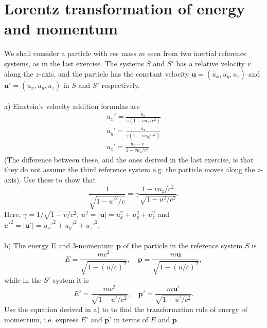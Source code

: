 \documentclass{article}
\begin{document}
    \section{Lorentz transformation of energy and momentum}
    We shall consider a particle with res mass $m$ seen from two inertial reference systems, as in the last exercise. The systems $S$ and $S'$ has a relative velocity $v$ along the $z$-axis, and the particle has the constant velocity $\mathbf{u} = (u_x, u_y, u_z)$ and $\mathbf{u'} = (u_x, u_y, u_z)$ in $S$ and $S'$ respectively. \\ \\
    a) Einstein's velocity addition formulas are
    \begin{align*}
        u_x' = \frac{u_x}{\gamma(1 - v u_z/c^2)} \\
        u_y' = \frac{u_x}{\gamma(1 - v u_y/c^2)} \\
        u_z' = \frac{u_z - v}{1 - v u_z/c^2}
    \end{align*}
    (The difference between these, and the ones derived in the last exercise, is that they do not assume the third reference system e.g. the particle moves along the $z$-axis). Use these to show that
    \begin{equation*}
        \frac{1}{\sqrt{1 - u'^2/c}} = \gamma \frac{1 - v u_z / c^2}{\sqrt{1 - u^2/c^2}}.
    \end{equation*}
    Here, $\gamma = 1 / \sqrt{1 - v/c^2}$, $u^2= |\mathbf{u}| = u_x^2 + u_y^2 + u_z^2$ and $u'^2= |\mathbf{u}'|= u_x'^2 + u_y'^2 + u_z'^2$. \\ \\
    b) The energy E and 3-momentum $\mathbf{p}$ of the particle in the reference system $S$ is
    \begin{equation*}
        E = \frac{mc^2}{\sqrt{1 - (u/c)^2}}, \quad \mathbf{p} =\frac{m\mathbf{u}}{\sqrt{1 - (u/c)^2}},
    \end{equation*}
    while in the $S'$ system it is
    \begin{equation*}
        E' = \frac{mc^2}{\sqrt{1 - u'/c^2}}, \quad \mathbf{p'} =\frac{m\mathbf{u'}}{\sqrt{1 - u'/c^2}}.
    \end{equation*}
    Use the equation derived in a) to to find the transformation rule of energy of momentum, i.e. express $E'$ and $\mathbf{p}'$ in terms of $E$ and $\mathbf{p}$.
\end{document}
